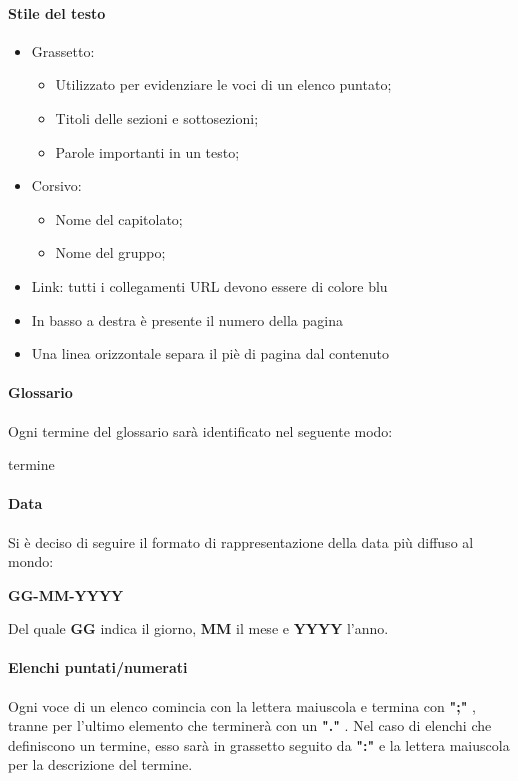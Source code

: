 \paragraph{Stile del testo}
\begin{itemize}
\item Grassetto:
\begin{itemize}
\item Utilizzato per evidenziare le voci di un elenco puntato;
\item Titoli delle sezioni e sottosezioni;
\item Parole importanti in un testo;
\end{itemize}
\item Corsivo:
\begin{itemize}
\item Nome del capitolato;
\item Nome del gruppo;
\end{itemize}
\item Link: tutti i collegamenti URL devono essere di colore blu
\item In basso a destra è presente il numero della pagina
\item Una linea orizzontale separa il piè di pagina dal contenuto

\end{itemize}

\paragraph*{Glossario}
Ogni termine del glossario sarà identificato nel seguente modo:
\begin{center}
termine
\end{center}

\paragraph*{Data}

Si è deciso di seguire il formato di rappresentazione della data più diffuso al mondo:\\
\begin{center}
\textbf{GG-MM-YYYY}
\end{center}
Del quale \textbf{GG} indica il giorno, \textbf{MM} il mese e \textbf{YYYY} l'anno.

\paragraph*{Elenchi puntati/numerati}
Ogni voce di un elenco comincia con la lettera maiuscola e termina con \textbf{";"} , tranne per l'ultimo elemento che terminerà con un \textbf{"."} . 
Nel caso di elenchi che definiscono un termine, esso sarà in grassetto seguito da \textbf{":"} e la lettera maiuscola per la descrizione del termine.

